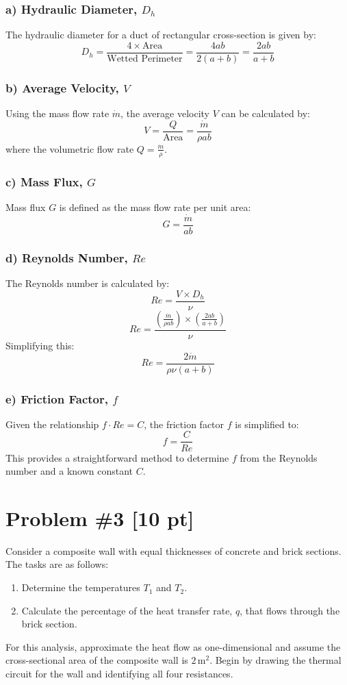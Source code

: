 \documentclass{article}
\begin{document}
\subsubsection*{a) Hydraulic Diameter, \( D_h \)}
The hydraulic diameter for a duct of rectangular cross-section is given by:
\[ D_h = \frac{4 \times \text{Area}}{\text{Wetted Perimeter}} = \frac{4ab}{2(a + b)} = \frac{2ab}{a + b} \]

\subsubsection*{b) Average Velocity, \( V \)}
Using the mass flow rate \( \dot{m} \), the average velocity \( V \) can be calculated by:
\[ V = \frac{Q}{\text{Area}} = \frac{\dot{m}}{\rho ab} \]
where the volumetric flow rate \( Q = \frac{\dot{m}}{\rho} \).

\subsubsection*{c) Mass Flux, \( G \)}
Mass flux \( G \) is defined as the mass flow rate per unit area:
\[ G = \frac{\dot{m}}{ab} \]

\subsubsection*{d) Reynolds Number, \( Re \)}
The Reynolds number is calculated by:
\[ Re = \frac{V \times D_h}{\nu} \]
\[ Re = \frac{\left(\frac{\dot{m}}{\rho ab}\right) \times \left(\frac{2ab}{a + b}\right)}{\nu} \]
Simplifying this:
\[ Re = \frac{2 \dot{m}}{\rho \nu (a + b)} \]

\subsubsection*{e) Friction Factor, \( f \)}
Given the relationship \( f \cdot Re = C \), the friction factor \( f \) is simplified to:
\[ f = \frac{C}{Re} \]
This provides a straightforward method to determine \( f \) from the Reynolds number and a known constant \( C \).


\newpage
\section{Problem \#3 [10 pt]}
Consider a composite wall with equal thicknesses of concrete and brick sections. The tasks are as follows:
\begin{enumerate}
    \item[(a)] Determine the temperatures \( T_1 \) and \( T_2 \).
    \item[(b)] Calculate the percentage of the heat transfer rate, \( q \), that flows through the brick section.
\end{enumerate}
For this analysis, approximate the heat flow as one-dimensional and assume the cross-sectional area of the composite wall is \( 2 \, \text{m}^2 \). Begin by drawing the thermal circuit for the wall and identifying all four resistances.
\end{document}
